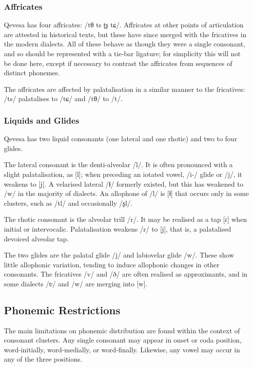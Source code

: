 \documentclass[grammar]{subfiles}
\begin{document}
	\subsubsection{Affricates}
	\label{sssec:affricates}

	Qevesa has four affricates: /tθ ts ʈʂ tɕ/. Affricates at other points of articulation are attested in historical texts, but these have since merged with the fricatives in the modern dialects. All of these behave as though they were a single consonant, and so should be represented with a tie-bar ligature; for simplicity this will not be done here, except if necessary to contrast the affricates from sequences of distinct phonemes. 

	The affricates are affected by palatalisation in a similar manner to the fricatives: /ts/ palatalises to /tɕ/ and /tθ/ to /t/.

	\subsubsection{Liquids and Glides}
	\label{sssec:liquids}

	Qevesa has two liquid consonants (one lateral and one rhotic) and two to four glides.

	The lateral consonant is the denti-alveolar /l/. It is often pronounced with a slight palatalisation, as [l\superj]; when preceding an iotated vowel, /i-/ glide or /j/, it weakens to [j]. A velarised lateral /ɫ/ formerly existed, but this has weakened to /w/ in the majority of dialects. An allophone of /l/ is [ɬ] that occurs only in some clusters, such as /tl/ and occasionally /ʂl/.

	The rhotic consonant is the alveolar trill /r/. It may be realised as a tap [ɾ] when initial or intervocalic. Palatalisation weakens /r/ to [j], that is, a palatalised devoiced alveolar tap.

	The two glides are the palatal glide /j/ and labiovelar glide /w/. These show little allophonic variation, tending to induce allophonic changes in other consonants. The fricatives /v/ and /ð/ are often realised as approximants, and in some dialects /ʋ/ and /w/ are merging into [w].

	\subsection{Phonemic Restrictions}
	\label{ssec:phonemic_restrictions}

	The main limitations on phonemic distribution are found within the context of consonant clusters. Any single consonant may appear in onset or coda position, word-initially, word-medially, or word-finally. Likewise, any vowel may occur in any of the three positions. 
\end{document}
